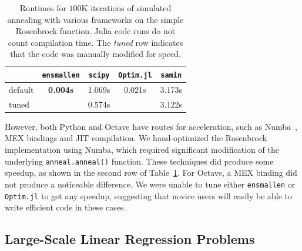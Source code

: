 \begin{table}[b!]
\begin{center}
\begin{tabular}{lcccc}
\toprule
 & {\tt ensmallen} & {\tt scipy} & {\tt Optim.jl} & {\tt samin} \\
\midrule
default & {\bf 0.004s} & 1.069s & 0.021s & 3.173s \\
tuned & & 0.574s & & 3.122s \\
\bottomrule
\end{tabular}
\end{center}
\vspace*{-0.5em}
\caption{Runtimes for $100$K iterations of simulated annealing with various
frameworks on the simple Rosenbrock function.  Julia code runs do not count
compilation time.  The {\it tuned} row indicates that the code was manually
modified for speed.}
\label{tab:rosenbrock_results}
\end{table}

However, both Python and Octave have routes for acceleration,
such as Numba~\cite{lam2015numba}, MEX bindings and JIT compilation.
We hand-optimized the Rosenbrock implementation using Numba,
which required significant modification of the
underlying \texttt{anneal.anneal()} function.
These techniques did produce some speedup,
as shown in the second row of Table~\ref{tab:rosenbrock_results}.
For Octave, a MEX binding did not produce a noticeable difference.
We were unable to tune either \texttt{ensmallen} or
\texttt{Optim.jl} to get any speedup,
suggesting that novice users will easily be able
to write efficient code in these cases.

\subsection{Large-Scale Linear Regression Problems}

